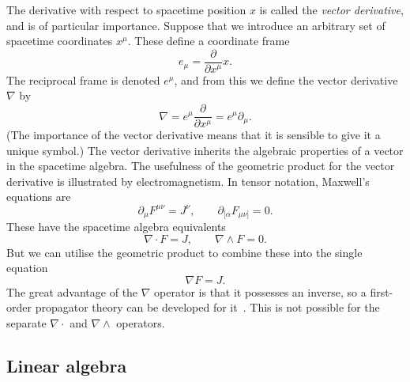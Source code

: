 \documentclass[a4paper]{article}
\numberwithin{equation}{section}
\newcommand{\dt}{\! \cdot \!}
\newcommand{\wdg}{\! \wedge \!}
\newcommand{\alp}{\alpha}
\newcommand{\dmu}{\partial_{\mu}}
\newcommand{\grad}{\nabla}
\newcommand{\deriv}[2]{\frac{\partial #1}{\partial #2}}
\begin{document}
The derivative with respect to spacetime position $x$ is called the
{\em vector derivative}, and is of particular importance.  Suppose
that we introduce an arbitrary set of spacetime coordinates $x^\mu$.
These define a coordinate frame
%
\begin{equation}
e_\mu = \deriv{}{x^\mu} x.
\end{equation}
%
The reciprocal frame is denoted $e^\mu$, and from this we define the
vector derivative $\grad$ by 
%
\begin{equation}
\grad = e^\mu  \deriv{}{x^\mu} = e^\mu \dmu.
\end{equation}
%
(The importance of the vector derivative means that it is sensible to
give it a unique symbol.)  The vector derivative inherits the
algebraic properties of a vector in the spacetime algebra.  The
usefulness of the geometric product for the vector derivative is
illustrated by electromagnetism.  In tensor notation, Maxwell's
equations are
%
\begin{equation}
\dmu F^{\mu\nu} = J^{\nu}, \qquad \partial_{[\alp} F_{\mu\nu]} = 0.
\end{equation}
%
These have the spacetime algebra equivalents~\cite{hes-sta} 
%
\begin{equation}
\grad \dt F = J, \qquad \grad \wdg F = 0 .
\end{equation}
%
But we can utilise the geometric product to combine these into the
single equation
%
\begin{equation}
\grad F = J.
\label{Imax}
\end{equation}
%
The great advantage of the $\grad$ operator is that it possesses an
inverse, so a first-order propagator theory can be developed for
it~\cite{hes-gc,DGL93-paths}.  This is not possible for the separate 
$\grad \cdot$ and $\grad \wedge$ operators.



%
\subsection{Linear algebra}
\label{O-Linalg}
%
\end{document}
